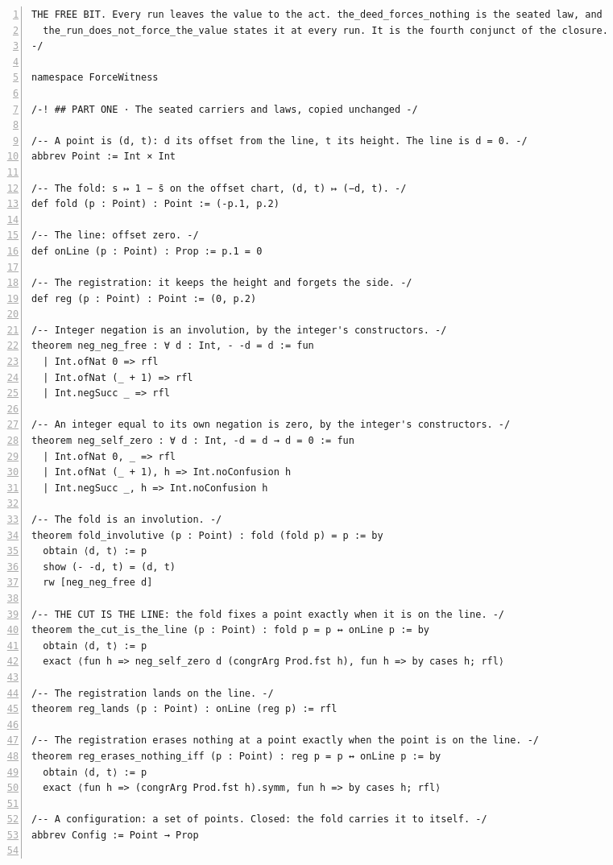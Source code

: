 \documentclass[10pt]{article}
\newcommand{\leansize}{\fontsize{5.5pt}{6.75pt}\selectfont}
\begin{document}
\begin{multicols}{2}
\begin{Verbatim}[numbers=left,firstnumber=1,numbersep=3pt,xleftmargin=2.6em,breaklines=true,breakanywhere=true,breakautoindent=false,breakindent=1.4em,breaksymbolleft={},breakanywheresymbolpre={},fontsize=\leansize]
  THE FREE BIT. Every run leaves the value to the act. the_deed_forces_nothing is the seated law, and
  the_run_does_not_force_the_value states it at every run. It is the fourth conjunct of the closure.
-/

namespace ForceWitness

/-! ## PART ONE · The seated carriers and laws, copied unchanged -/

/-- A point is (d, t): d its offset from the line, t its height. The line is d = 0. -/
abbrev Point := Int × Int

/-- The fold: s ↦ 1 − s̄ on the offset chart, (d, t) ↦ (−d, t). -/
def fold (p : Point) : Point := (-p.1, p.2)

/-- The line: offset zero. -/
def onLine (p : Point) : Prop := p.1 = 0

/-- The registration: it keeps the height and forgets the side. -/
def reg (p : Point) : Point := (0, p.2)

/-- Integer negation is an involution, by the integer's constructors. -/
theorem neg_neg_free : ∀ d : Int, - -d = d := fun
  | Int.ofNat 0 => rfl
  | Int.ofNat (_ + 1) => rfl
  | Int.negSucc _ => rfl

/-- An integer equal to its own negation is zero, by the integer's constructors. -/
theorem neg_self_zero : ∀ d : Int, -d = d → d = 0 := fun
  | Int.ofNat 0, _ => rfl
  | Int.ofNat (_ + 1), h => Int.noConfusion h
  | Int.negSucc _, h => Int.noConfusion h

/-- The fold is an involution. -/
theorem fold_involutive (p : Point) : fold (fold p) = p := by
  obtain ⟨d, t⟩ := p
  show (- -d, t) = (d, t)
  rw [neg_neg_free d]

/-- THE CUT IS THE LINE: the fold fixes a point exactly when it is on the line. -/
theorem the_cut_is_the_line (p : Point) : fold p = p ↔ onLine p := by
  obtain ⟨d, t⟩ := p
  exact ⟨fun h => neg_self_zero d (congrArg Prod.fst h), fun h => by cases h; rfl⟩

/-- The registration lands on the line. -/
theorem reg_lands (p : Point) : onLine (reg p) := rfl

/-- The registration erases nothing at a point exactly when the point is on the line. -/
theorem reg_erases_nothing_iff (p : Point) : reg p = p ↔ onLine p := by
  obtain ⟨d, t⟩ := p
  exact ⟨fun h => (congrArg Prod.fst h).symm, fun h => by cases h; rfl⟩

/-- A configuration: a set of points. Closed: the fold carries it to itself. -/
abbrev Config := Point → Prop


\end{Verbatim}
\end{multicols}
\end{document}
